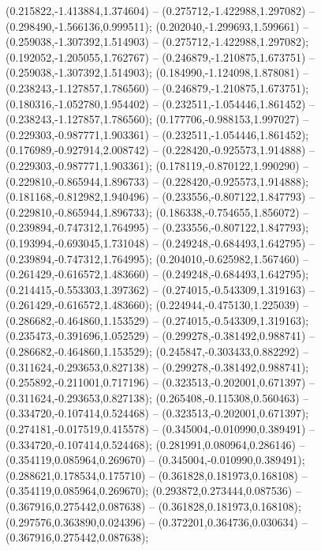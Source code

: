  (0.215822,-1.413884,1.374604) -- (0.275712,-1.422988,1.297082) -- (0.298490,-1.566136,0.999511);
 (0.202040,-1.299693,1.599661) -- (0.259038,-1.307392,1.514903) -- (0.275712,-1.422988,1.297082);
 (0.192052,-1.205055,1.762767) -- (0.246879,-1.210875,1.673751) -- (0.259038,-1.307392,1.514903);
 (0.184990,-1.124098,1.878081) -- (0.238243,-1.127857,1.786560) -- (0.246879,-1.210875,1.673751);
 (0.180316,-1.052780,1.954402) -- (0.232511,-1.054446,1.861452) -- (0.238243,-1.127857,1.786560);
 (0.177706,-0.988153,1.997027) -- (0.229303,-0.987771,1.903361) -- (0.232511,-1.054446,1.861452);
 (0.176989,-0.927914,2.008742) -- (0.228420,-0.925573,1.914888) -- (0.229303,-0.987771,1.903361);
 (0.178119,-0.870122,1.990290) -- (0.229810,-0.865944,1.896733) -- (0.228420,-0.925573,1.914888);
 (0.181168,-0.812982,1.940496) -- (0.233556,-0.807122,1.847793) -- (0.229810,-0.865944,1.896733);
 (0.186338,-0.754655,1.856072) -- (0.239894,-0.747312,1.764995) -- (0.233556,-0.807122,1.847793);
 (0.193994,-0.693045,1.731048) -- (0.249248,-0.684493,1.642795) -- (0.239894,-0.747312,1.764995);
 (0.204010,-0.625982,1.567460) -- (0.261429,-0.616572,1.483660) -- (0.249248,-0.684493,1.642795);
 (0.214415,-0.553303,1.397362) -- (0.274015,-0.543309,1.319163) -- (0.261429,-0.616572,1.483660);
 (0.224944,-0.475130,1.225039) -- (0.286682,-0.464860,1.153529) -- (0.274015,-0.543309,1.319163);
 (0.235473,-0.391696,1.052529) -- (0.299278,-0.381492,0.988741) -- (0.286682,-0.464860,1.153529);
 (0.245847,-0.303433,0.882292) -- (0.311624,-0.293653,0.827138) -- (0.299278,-0.381492,0.988741);
 (0.255892,-0.211001,0.717196) -- (0.323513,-0.202001,0.671397) -- (0.311624,-0.293653,0.827138);
 (0.265408,-0.115308,0.560463) -- (0.334720,-0.107414,0.524468) -- (0.323513,-0.202001,0.671397);
 (0.274181,-0.017519,0.415578) -- (0.345004,-0.010990,0.389491) -- (0.334720,-0.107414,0.524468);
 (0.281991,0.080964,0.286146) -- (0.354119,0.085964,0.269670) -- (0.345004,-0.010990,0.389491);
 (0.288621,0.178534,0.175710) -- (0.361828,0.181973,0.168108) -- (0.354119,0.085964,0.269670);
 (0.293872,0.273444,0.087536) -- (0.367916,0.275442,0.087638) -- (0.361828,0.181973,0.168108);
 (0.297576,0.363890,0.024396) -- (0.372201,0.364736,0.030634) -- (0.367916,0.275442,0.087638);
